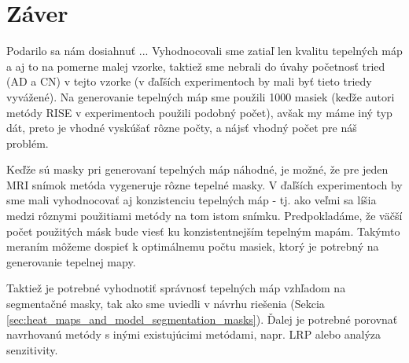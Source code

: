\section{Záver}

Podarilo sa nám dosiahnuť ...
Vyhodnocovali sme zatiaľ len kvalitu tepelných máp a aj to na pomerne malej vzorke, taktiež sme nebrali do úvahy početnosť tried (AD a CN) v tejto vzorke (v ďaľších experimentoch by mali byť tieto triedy vyvážené).
Na generovanie tepelných máp sme použili 1000 masiek (keďže autori metódy RISE v experimentoch použili podobný počet), avšak my máme iný typ dát, preto je vhodné vyskúšať rôzne počty, a nájsť vhodný počet pre náš problém.

Keďže sú masky pri generovaní tepelných máp náhodné, je možné, že pre jeden MRI snímok metóda vygeneruje rôzne tepelné masky. V ďaľších experimentoch by sme mali vyhodnocovať aj konzistenciu tepelných máp - tj. ako veľmi sa líšia medzi rôznymi použitiami metódy na tom istom snímku.
Predpokladáme, že väčší počet použitých másk bude viesť ku konzistentnejším tepelným mapám. Takýmto meraním môžeme dospieť k optimálnemu počtu masiek, ktorý je potrebný na generovanie tepelnej mapy.

Taktiež je potrebné vyhodnotiť správnosť tepelných máp vzhľadom na segmentačné masky, tak ako sme uviedli v návrhu riešenia (Sekcia \ref{sec:heat_maps_and_model_segmentation_masks}). 
Ďalej je potrebné porovnať navrhovanú metódy s inými existujúcimi metódami, napr. LRP alebo analýza senzitivity.


